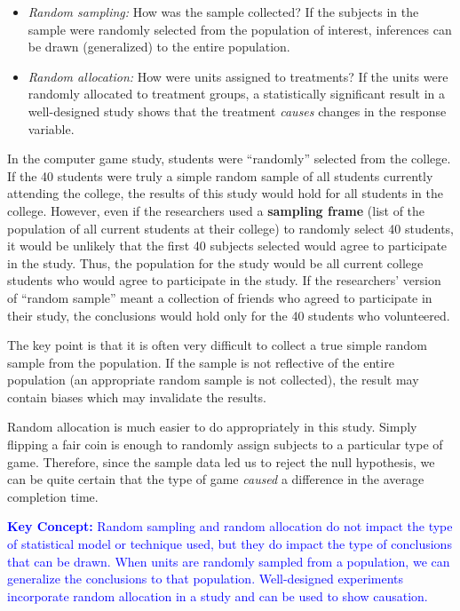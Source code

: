 \documentclass[
]{report}
\begin{document}
\begin{itemize}
\item
  \emph{Random sampling:} How was the sample collected? If the subjects in the sample were randomly selected from the population of interest, inferences can be drawn (generalized) to the entire population.
\item
  \emph{Random allocation:} How were units assigned to treatments? If the units were randomly allocated to treatment groups, a statistically significant result in a well-designed study shows that the treatment \emph{causes} changes in the response variable.
\end{itemize}

In the computer game study, students were ``randomly'' selected from the college. If the 40 students were truly a simple random sample of all students currently attending the college, the results of this study would hold for all students in the college. However, even if the researchers used a \textbf{sampling frame} (list of the population of all current students at their college) to randomly select 40 students, it would be unlikely that the first 40 subjects selected would agree to participate in the study. Thus, the population for the study would be all current college students who would agree to participate in the study. If the researchers' version of ``random sample'' meant a collection of friends who agreed to participate in their study, the conclusions would hold only for the 40 students who volunteered.

The key point is that it is often very difficult to collect a true simple random sample from the population. If the sample is not reflective of the entire population (an appropriate random sample is not collected), the result may contain biases which may invalidate the results.

Random allocation is much easier to do appropriately in this study. Simply flipping a fair coin is enough to randomly assign subjects to a particular type of game. Therefore, since the sample data led us to reject the null hypothesis, we can be quite certain that the type of game \emph{caused} a difference in the average completion time.

\textbf{\textcolor{blue}{Key Concept:}} \textcolor{blue}{Random sampling and random allocation do not impact the type of statistical model or technique used, but they do impact the type of conclusions that can be drawn. When units are randomly sampled from a population, we can generalize the conclusions to that population. Well-designed experiments incorporate random allocation in a study and can be used to show causation.}
\end{document}
